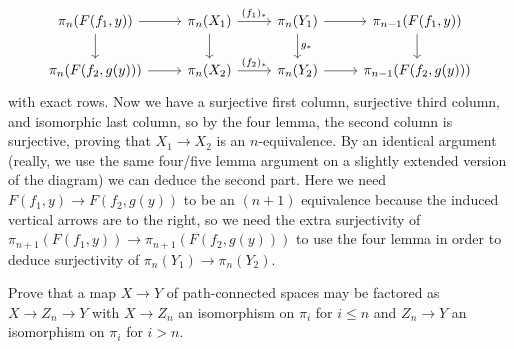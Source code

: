 \documentclass[11pt,letterpaper]{article}
\begin{document}
\begin{solution}
\[\begin{tikzcd}
	{\pi_n(F(f_1,y))} & {\pi_n(X_1)} & {\pi_n(Y_1)} & {\pi_{n-1}(F(f_1,y))} \\
	{\pi_n(F(f_2,g(y)))} & {\pi_n(X_2)} & {\pi_n(Y_2)} & {\pi_{n-1}(F(f_2,g(y)))}
	\arrow[from=2-1, to=2-2]
	\arrow["{(f_2)_*}", from=2-2, to=2-3]
	\arrow["{(f_1)_*}", from=1-2, to=1-3]
	\arrow[from=1-1, to=1-2]
	\arrow[from=1-1, to=2-1]
	\arrow[from=1-2, to=2-2]
	\arrow["{g_*}", from=1-3, to=2-3]
	\arrow[from=2-3, to=2-4]
	\arrow[from=1-3, to=1-4]
	\arrow[from=1-4, to=2-4]
\end{tikzcd}\]
with exact rows. Now we have a surjective first column, surjective third column, and isomorphic last column, so by the four lemma, the second column is surjective, proving that $X_1 \to X_2$ is an $n$-equivalence. By an identical argument (really, we use the same four/five lemma argument on a slightly extended version of the diagram) we can deduce the second part. Here we need $F(f_1,y)\to F(f_2, g(y))$ to be an $(n+1)$ equivalence because the induced vertical arrows are to the right, so we need the extra surjectivity of $\pi_{n+1}(F(f_1, y)) \to \pi_{n+1}(F(f_2,g(y)))$ to use the four lemma in order to deduce surjectivity of $\pi_n(Y_1) \to \pi_n(Y_2)$.
\end{solution}

\begin{problem}
    Prove that a map $X \to Y$ of path-connected spaces may be factored as $X \to Z_n \to Y$ with $X \to Z_n$ an isomorphism on $\pi_i$ for $i\leq n$ and $Z_n\to Y$ an isomorphism on $\pi_i$ for $i>n$. 
\end{problem}
\end{document}
